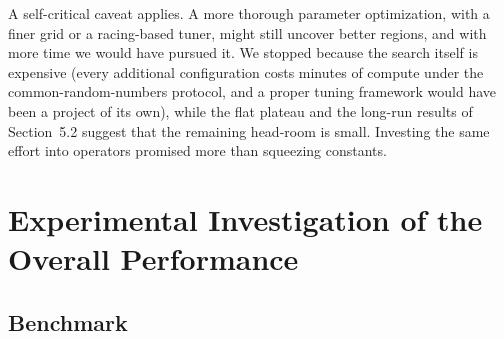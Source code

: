 \documentclass[10pt, a4paper]{article}
\begin{document}
A self-critical caveat applies. A more thorough parameter optimization,
with a finer grid or a racing-based tuner, might still uncover better
regions, and with more time we would have pursued it. We stopped because
the search itself is expensive (every additional configuration costs
minutes of compute under the common-random-numbers protocol, and a proper
tuning framework would have been a project of its own), while the flat
plateau and the long-run results of Section~5.2 suggest that the remaining
head-room is small. Investing the same effort into operators promised more
than squeezing constants.

\section{Experimental Investigation of the Overall Performance}
\subsection{Benchmark}
\end{document}
